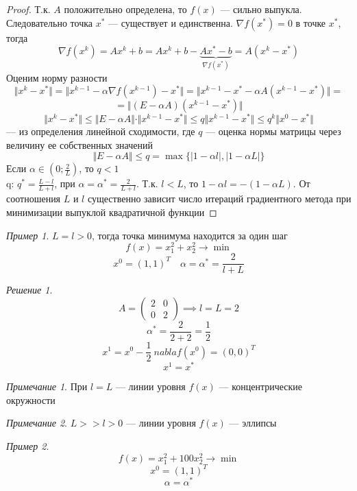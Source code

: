 \documentclass[oneside]{book}
\theoremstyle{plain}
\theoremstyle{remark}
\newtheorem*{remark}{Примечание}
\newtheorem*{solution}{Решение}
\newtheorem*{examp}{Пример}
\theoremstyle{definition}
\begin{document}
\begin{proof}
Т.к. \(A\) положительно определена, то \(f(x)\) --- сильно выпукла. Следовательно точка \(x^*\) --- существует и единственна. \(\nabla f(x^*) = 0\) в точке \(x^*\), тогда
\[ \nabla f(x^k) = A x^k + b = A x^k + b - \underbrace{A x^* - b}_{\nabla f(x^*)} = A(x^k - x^*) \]
Оценим норму разности
\[ \Vert x^k - x^* \Vert = \Vert x^{k - 1} - \alpha \nabla f(x^{k - 1}) - x^* \Vert = \Vert x^{k - 1} - x^* - \alpha A(x^{k - 1} - x^*) \Vert = \]
\[ = \Vert (E - \alpha A) (x^{k - 1} - x^*)  \Vert \]
\[ \Vert x^k - x^* \Vert \le \Vert E - \alpha A \Vert \cdot \Vert x^{k - 1} - x^* \Vert \le q \Vert x^{k - 1} - x^* \Vert \le q^k \Vert x^0 - x^* \Vert \]
--- из определения линейной сходимости, где \(q\) --- оценка нормы матрицы через величину ее собственных значений
\[ \Vert E - \alpha A \Vert \le q = \max \{|1 - \alpha l|, |1 - \alpha L|\} \]
Если \(\alpha \in (0; \frac{2}{L})\), то \(q < 1\) \\
q: \(q^* = \frac{L - l}{L + l}\), при \(\alpha = \alpha^* = \frac{2}{L + l}\). Т.к. \(l < L\), то \(1 - \alpha l = - (1 - \alpha L)\). От соотношения \(L\) и \(l\) существенно зависит число итераций градиентного метода при минимизации выпуклой квадратичной функции
\end{proof}
\begin{examp}
\(L = l > 0\), тогда точка минимума находится за один шаг
\[ f(x) = x_1^2 + x_2^2 \to \min \]
\[ x^0 = (1, 1)^T \quad \alpha = \alpha^* = \frac{2}{l + L}\]
\end{examp}
\begin{solution}
\[ A = \begin{pmatrix} 2 & 0 \\ 0 & 2 \end{pmatrix} \implies l = L = 2 \]
\[ \alpha^* = \frac{2}{2 + 2} = \frac{1}{2} \]
\[ x^1 = x^0 - \frac{1}{2}\ nabla f(x^0) = (0, 0)^T \]
\[ x^1 = x^* \]
\end{solution}
\begin{remark}
При \(l = L\) --- линии уровня \(f(x)\) --- концентрические окружности
\end{remark}
\begin{remark}
\(L >> l > 0\) --- линии уровня \(f(x)\) --- эллипсы
\end{remark}
\begin{examp}
\[ f(x) = x_1^2 + 100x^2_2 \to \min \]
\[ x^0 = (1, 1)^T \]
\[ \alpha = \alpha^* \]
\end{examp}
\end{document}
